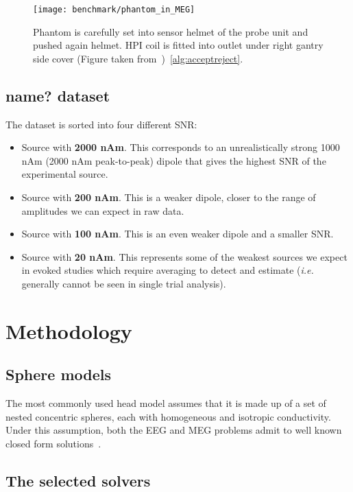 \begin{figure}[tb]
   \centering
\texttt{[image: benchmark/phantom\_in\_MEG]}
\caption{Phantom is carefully set into sensor helmet of the probe unit and pushed again helmet. HPI coil is fitted into outlet under right gantry side cover (Figure taken from~\cite{hazim2015magnetoencephalography})~\ref{alg:acceptreject}.}
   \label{fig:phantom_in_MEG}
\end{figure}


\subsection{name? dataset} \label{data:used_data}

The dataset is sorted into four different SNR:
\begin{itemize}
\item Source with \textbf{2000 nAm}. This corresponds to an unrealistically strong 1000 nAm (2000 nAm peak-to-peak) dipole that gives the highest SNR of the experimental source.
\item Source with \textbf{200 nAm}. This is a weaker dipole, closer to the range of amplitudes we can expect in raw data.
\item Source with \textbf{100 nAm}. This is an even weaker dipole and a smaller SNR.
\item Source with \textbf{20 nAm}. This represents some of the weakest sources we expect in evoked studies which require averaging to detect and estimate (\textit{i.e.} generally cannot be seen in single trial analysis).
\end{itemize}

\section{Methodology}

\subsection{Sphere models}
The most commonly used head model assumes that it is made up of a set of nested concentric spheres, each with homogeneous and isotropic conductivity. Under this assumption, both the EEG and MEG problems admit to well known closed form solutions~\cite{mosher1999eeg}.

\subsection{The selected solvers}
